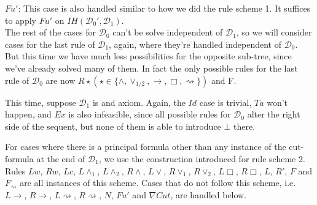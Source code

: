 \documentclass[a4paper, 12pt]{paper}
\begin{document}
 $Fu'$: This case is also handled similar to how we did the rule scheme 1.
 It suffices to apply $Fu'$ on $IH(\mathcal{D}_0', \mathcal{D}_1)$.\\

 The rest of the cases for $\mathcal{D}_0$ can't be solve independent of $\mathcal{D}_1$, so we will consider cases for the last rule of $\mathcal{D}_1$, again, where they're handled independent of $\mathcal{D}_0$.
 But this time we have much less possibilities for the opposite sub-tree, since we've already solved many of them. In fact the only possible rules for the last rule of $\mathcal{D}_0$ are now $R\star (\star \in \{\land, \lor_{1/2}, \rightarrow, \Box, \rightsquigarrow\})$ and F.

 This time, suppose $\mathcal{D}_1$ is and axiom. Again, the $Id$ case is trivial, $Ta$ won't happen, and $Ex$ is also infeasible, since all possible rules for $\mathcal{D}_0$ alter the right side of the sequent, but none of them is able to introduce $\bot$ there.

 For cases where there is a principal formula other than any instance of the cut-formula at the end of $\mathcal{D}_1$, we use the construction introduced for rule scheme 2. Rules $Lw$, $Rw$, $Lc$, $L\land_1$, $L\land_2$, $R\land$, $L\lor$, $R\lor_1$, $R\lor_2$, $L\Box$, $R\Box$, $L$, $R'$, $F$ and $F_\rightsquigarrow$ are all instances of this scheme. Cases that do not follow this scheme, i.e. $L\rightarrow$, $R\rightarrow$, $L\rightsquigarrow$, $R\rightsquigarrow$, $N$, $Fu'$ and $\nabla Cut$, are handled below.\\
\end{document}
